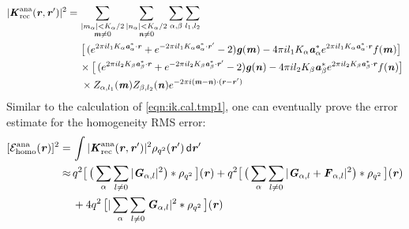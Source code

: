 \documentclass[aps,pre,preprint,unsortedaddress]{revtex4}
\renewcommand{\v}[1]{\textbf{\textit{#1}}}
\renewcommand{\d}[1]{\textsf{#1}}
\begin{document}
\begin{align}
  \vert\v K^{\textrm{ana}}_{\textrm{rec}}(\v r,\v r')\vert^2
  =\,&
  \sum_{
    \begin{subarray}{c}
      \vert m_{\alpha}\vert < K_\alpha/2\\
      \v m\neq 0
    \end{subarray}}
  \sum_{
    \begin{subarray}{c}
      \vert n_{\alpha}\vert < K_\alpha/2\\
      \v n\neq 0
    \end{subarray}}
  \sum_{\alpha,\beta}
  \sum_{l_1,l_2}
  \\\nonumber
  &\,
  \big[
  \,(
  e^{2\pi i l_1 K_\alpha\v a^\ast_\alpha\cdot \v r} +
  e^{-2\pi i l_1 K_\alpha\v a^\ast_\alpha\cdot \v r'}
  - 2
  )
  \v g(\v m)
  - 4\pi i l_1 K_\alpha\v a_\alpha^\ast e^{2\pi i l_1 K_\alpha\v a^\ast_\alpha\cdot \v r}
  f(\v m)
  \big] \\\nonumber
  \,&
  \times
  \big[
  \,(
  e^{2\pi i l_2 K_\beta\v a^\ast_\beta\cdot \v r} +
  e^{-2\pi i l_2 K_\beta\v a^\ast_\beta\cdot \v r'}
  - 2
  )
  \v g(\v n)
  - 4\pi i l_2 K_\beta\v a_\beta^\ast e^{2\pi i l_2 K_\beta\v a^\ast_\beta\cdot \v r}
  f(\v n)
  \big]
  \\
  &\,
  \times
  Z_{\alpha,l_1}(\v m)Z_{\beta,l_2}(\v n)
  e^{-2\pi i(\v m-\v n)\cdot(\v r-\v r')}
\end{align}
Similar to the calculation of \eqref{eqn:ik.cal.tmp1}, one can eventually
prove the error estimate for the homogeneity RMS error:
\begin{align}\nonumber
  [\mathcal E^{\textrm{ana}}_{\textrm{homo}}(\v r)]^2
  = \,&
  \int
  \vert\v K^{\textrm{ana}}_{\textrm{rec}}(\v r,\v r')\vert^2
  \rho_{q^2}(\v r')\,\d d\v r' \\\nonumber
  \approx\,&  
  q^2
  \big[\,
  \big(
  \sum_{\alpha} \sum_{l\neq 0}
  \vert \v G_{\alpha,l}\vert^2
  \big)
  \ast \rho_{q^2}
  \,\big] (\v r) +
  q^2
  \big[\,
  \big(
  \sum_{\alpha} \sum_{l\neq 0}
  \vert \v G_{\alpha,l} +\v F_{\alpha,l}\vert^2
  \big)
  \ast \rho_{q^2}
  \,\big] (\v r) \\
  \,&+
  4q^2\,
  \big[
  \vert
  \sum_{\alpha} \sum_{l\neq 0}  
  \v G_{\alpha,l}
  \vert^2
  \ast \rho_{q^2}\,
  \big] (\v r) 
\end{align}
\end{document}
